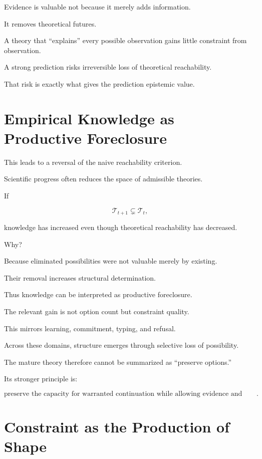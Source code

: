 \documentclass[11pt]{article}
\theoremstyle{remark}
\begin{document}
Evidence is valuable not because it merely adds information.

It removes theoretical futures.

A theory that ``explains'' every possible observation gains little constraint from observation.

A strong prediction risks irreversible loss of theoretical reachability.

That risk is exactly what gives the prediction epistemic value.

\section{Empirical Knowledge as Productive Foreclosure}

This leads to a reversal of the naive reachability criterion.

Scientific progress often reduces the space of admissible theories.

If

\begin{equation}
\mathcal{T}_{t+1}
\subsetneq
\mathcal{T}_t,
\end{equation}

knowledge has increased even though theoretical reachability has decreased.

Why?

Because eliminated possibilities were not valuable merely by existing.

Their removal increases structural determination.

Thus knowledge can be interpreted as productive foreclosure.

The relevant gain is not option count but constraint quality.

This mirrors learning, commitment, typing, and refusal.

Across these domains, structure emerges through selective loss of possibility.

The mature theory therefore cannot be summarized as ``preserve options.''

Its stronger principle is:

\begin{equation}
\boxed{
\text{preserve the capacity for warranted continuation while allowing evidence and commitment to close unwarranted paths}.
}
\end{equation}

\section{Constraint as the Production of Shape}
\end{document}
